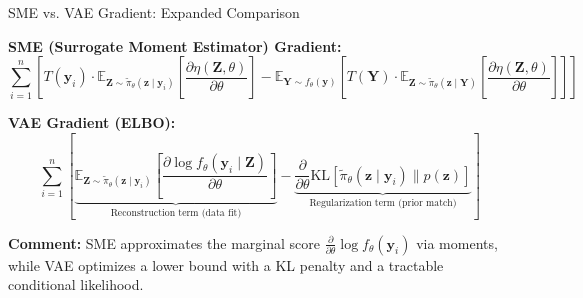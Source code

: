 \documentclass{beamer}
\begin{document}
\begin{frame}{SME vs. VAE Gradient: Expanded Comparison}

\textbf{SME (Surrogate Moment Estimator) Gradient:}
\[
\sum_{i=1}^n \left[
T(\mathbf{y}_i)
\cdot
\mathbb{E}_{\mathbf{Z} \sim \tilde{\pi}_\theta(\mathbf{z} \mid \mathbf{y}_i)}
\left[
\frac{\partial \eta(\mathbf{Z}, \theta)}{\partial \theta}
\right]
-
\mathbb{E}_{\mathbf{Y} \sim f_\theta(\mathbf{y})}
\left[
T(\mathbf{Y})
\cdot
\mathbb{E}_{\mathbf{Z} \sim \tilde{\pi}_\theta(\mathbf{z} \mid \mathbf{Y})}
\left[
\frac{\partial \eta(\mathbf{Z}, \theta)}{\partial \theta}
\right]
\right]
\right]
\]

\vspace{1em}

\textbf{VAE Gradient (ELBO):}
\[
\sum_{i=1}^n
\left[
\underbrace{
\mathbb{E}_{\mathbf{Z} \sim \tilde{\pi}_\theta(\mathbf{z} \mid \mathbf{y}_i)}
\left[
\frac{\partial \log f_\theta(\mathbf{y}_i \mid \mathbf{Z})}{\partial \theta}
\right]
}_{\text{Reconstruction term (data fit)}}
-
\underbrace{
\frac{\partial}{\partial \theta} \text{KL} \left[ \tilde{\pi}_\theta(\mathbf{z} \mid \mathbf{y}_i) \| p(\mathbf{z}) \right]
}_{\text{Regularization term (prior match)}}
\right]
\]

\vspace{1em}

\textbf{Comment:}  
SME approximates the marginal score \(\frac{\partial}{\partial \theta} \log f_\theta(\mathbf{y}_i)\) via moments,  
while VAE optimizes a lower bound with a KL penalty and a tractable conditional likelihood.

\end{frame}
\end{document}
